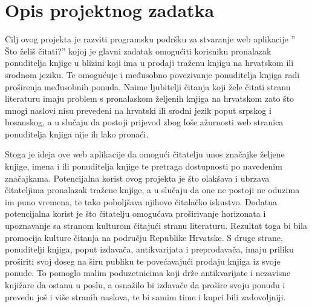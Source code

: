 \chapter{Opis projektnog zadatka}
		
		
		 Cilj ovog projekta je razviti programsku podršku za stvaranje web aplikacije  ” Što želiš čitati?” kojoj je glavni zadatak omogućiti korisniku pronalazak ponuditelja knjige u blizini koji ima u prodaji traženu knjigu na hrvatskom ili srodnom jeziku. Te omogućuje i međusobno povezivanje ponuditelja knjiga radi proširenja međusobnih ponuda. Naime ljubitelji čitanja koji žele čitati stranu literaturu imaju problem s pronalaskom željenih knjiga na hrvatskom zato što mnogi naslovi nisu prevedeni na hrvatski ili srodni jezik poput srpskog i bosanskog, a u slučaju da postoji prijevod zbog loše ažurnosti web stranica ponuditelja knjiga nije ih lako pronaći.  

        Stoga je ideja ove web aplikacije da omogući čitatelju unos značajke željene knjige, imena i ili ponuditelja knjige te pretraga dostupnosti po navedenim značajkama.  Potencijalna korist ovog projekta je što olakšava i ubrzava čitateljima pronalazak tražene knjige, a u slučaju da one ne postoji ne oduzima im puno vremena, te tako poboljšava njihovo čitalačko iskustvo.  Dodatna potencijalna korist je što čitatelju omogućava proširivanje horizonata i upoznavanje sa stranom kulturom čitajući stranu literaturu. Rezultat toga bi bila promocija kulture čitanja na području Republike Hrvatske. S druge strane, ponuditelji knjiga, poput izdavača, antikvarijata i preprodavača, imaju priliku proširiti svoj doseg na širu publiku te povećavajući prodaju knjiga iz svoje ponude. To pomoglo malim poduzetnicima koji drže antikvarijate i nezavisne knjižare da ostanu u poslu, a osnažilo bi izdavače  da prošire svoju ponudu i prevedu još i više stranih naslova, te bi samim time i kupci bili zadovoljniji. \\ 

